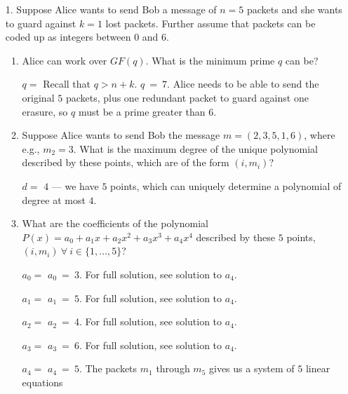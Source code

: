 \documentclass[11pt,preview]{standalone} %
\begin{document}

\begin{enumerate}
  \item[1.] Suppose Alice wants to send Bob a message of $n = 5$ packets and she wants to guard against $k = 1$ lost packets. Further assume that packets can be coded up as integers between $0$ and $6$. 
  \begin{enumerate}
    \item Alice can work over $GF(q)$. What is the minimum prime $q$ can be?
    \begin{Freeform}{7}
    $q = $
    \Hint Recall that $q > n + k$.
    \Solution $q\ =\ 7$. Alice needs to be able to send the original $5$ packets, plus one redundant packet to guard against one erasure, so $q$ must be a prime greater than $6$.
    \end{Freeform}
    \item Suppose Alice wants to send Bob the message $m = (2,3,5,1,6)$, where e.g., $m_2 = 3$. What is the maximum degree of the unique polynomial described by these points, which are of the form $(i,m_i)$?
    \begin{Freeform}{4}
    $d = $
    \Solution $4$ --- we have $5$ points, which can uniquely determine a polynomial of degree at most $4$.
    \end{Freeform}
    \item What are the coefficients of the polynomial $P(x) = a_0 + a_1 x + a_2 x^2 + a_3 x^3 + a_4 x^4$ described by these $5$ points, $(i,m_i) \ \forall \ i \in \{1,\dotsc,5\}$?
    \begin{Freeform}{3}
    $a_0 = $
    \Solution $a_0\ =\ 3$. For full solution, see solution to $a_4$.
    \end{Freeform}
    \begin{Freeform}{5}
    $a_1 = $
    \Solution $a_1\ =\ 5$. For full solution, see solution to $a_4$.
    \end{Freeform}
    \begin{Freeform}{4}
    $a_2 = $
    \Solution $a_2\ =\ 4$. For full solution, see solution to $a_4$.
    \end{Freeform}
    \begin{Freeform}{6}
    $a_3 = $
    \Solution $a_3\ =\ 6$. For full solution, see solution to $a_4$.
    \end{Freeform}
    \begin{Freeform}{5}
    $a_4 = $
    \Solution $a_4\ =\ 5$. The packets $m_1$ through $m_5$ gives us a system of $5$ linear equations


\end{Freeform}
\end{enumerate}
\end{enumerate}
\end{document}
